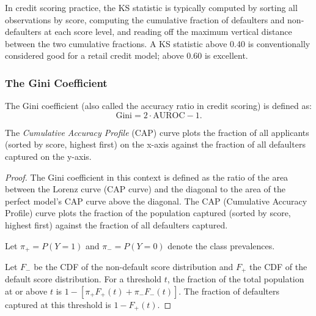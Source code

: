 \begin{context}
In credit scoring practice, the KS statistic is typically computed by sorting all observations by score, computing the cumulative fraction of defaulters and non-defaulters at each score level, and reading off the maximum vertical distance between the two cumulative fractions. A KS statistic above 0.40 is conventionally considered good for a retail credit model; above 0.60 is excellent.

\subsubsection*{The Gini Coefficient}

The Gini coefficient (also called the accuracy ratio in credit scoring) is defined as:
\begin{equation}
  \text{Gini} = 2 \cdot \text{AUROC} - 1.
  \label{eq:gini}
\end{equation}

The \emph{Cumulative Accuracy Profile} (CAP) curve plots the fraction of all applicants (sorted by score, highest first) on the x-axis against the fraction of all defaulters captured on the y-axis.

\begin{proof}
The Gini coefficient in this context is defined as the ratio of the area between the Lorenz curve (CAP curve) and the diagonal to the area of the perfect model's CAP curve above the diagonal. The CAP (Cumulative Accuracy Profile) curve plots the fraction of the population captured (sorted by score, highest first) against the fraction of all defaulters captured.

Let $\pi_+ = P(Y=1)$ and $\pi_- = P(Y=0)$ denote the class prevalences.

Let $F_-$ be the CDF of the non-default score distribution and $F_+$ the CDF of the default score distribution. For a threshold $t$, the fraction of the total population at or above $t$ is $1 - [\pi_+ F_+(t) + \pi_- F_-(t)]$. The fraction of defaulters captured at this threshold is $1 - F_+(t)$.


\end{proof}
\end{context}
